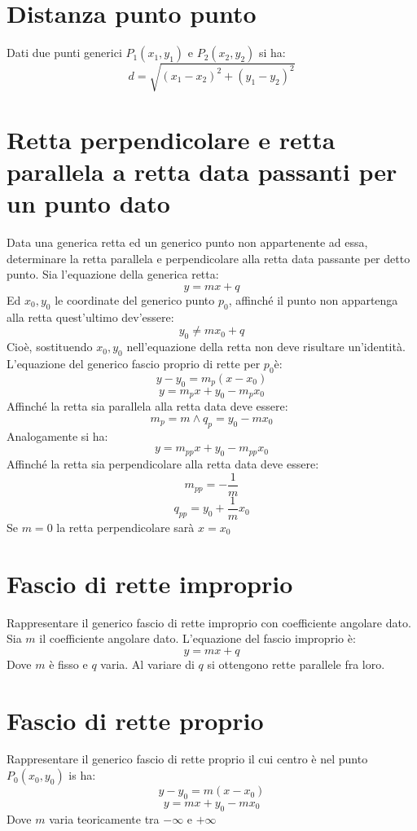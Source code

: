 \documentclass[12pt]{book}
\begin{document}
		\section{Distanza punto punto}
			Dati due punti generici $P_1(x_1,y_1)$ e $P_2(x_2,y_2)$ si ha:
			\[d=\sqrt{(x_1-x_2)^2+(y_1-y_2)^2}\]
		\section{Retta perpendicolare e retta parallela a retta data passanti per un punto dato}
			Data una generica retta ed un generico punto non appartenente ad essa, determinare la retta parallela e perpendicolare alla retta data passante per detto punto.
			Sia l’equazione della generica retta:
			\[y=mx+q\]
			Ed $x_0,y_0$ le coordinate del generico punto $p_0$,
			affinché il punto non appartenga alla retta quest'ultimo dev'essere:
			\[y_0\neq mx_0+q\]
			Cioè, sostituendo $x_0,y_0$ nell'equazione della retta non deve risultare un'identità.
			L'equazione del generico fascio proprio di rette per $p_0$è:
			\[y-y_0=m_p(x-x_0)\]
			\[y=m_px+y_0-m_px_0\]
			Affinché la retta sia parallela alla retta data deve essere:
			\[m_p=m\land q_p=y_0-mx_0\]
			Analogamente si ha:
			\[y=m_{pp}x+y_0-m_{pp}x_0\]
			Affinché la retta sia perpendicolare alla retta data deve essere:
			\[m_{pp}=-\frac{1}{m}\]
			\[q_{pp}=y_0+\frac{1}{m}x_0\]
			Se $m=0$ la retta perpendicolare sarà $x=x_0$
			\newpage
			
		\section{Fascio di rette improprio}
			Rappresentare il generico fascio di rette improprio con coefficiente angolare dato.
			Sia $m$ il coefficiente angolare dato.
			L'equazione del fascio improprio è:
			\[y=mx+q\]
			Dove $m$ è fisso e $q$ varia. Al variare di $q$ si ottengono rette parallele fra loro.
		
		\section{Fascio di rette proprio}
			Rappresentare il generico fascio di rette proprio il cui centro è nel punto $P_0(x_0,y_0)$ is ha:
			\[y-y_0=m(x-x_0)\]
			\[y=mx+y_0-mx_0\]
			Dove $m$ varia teoricamente tra $-\infty$ e $+\infty$
			\newpage
			
\end{document}

